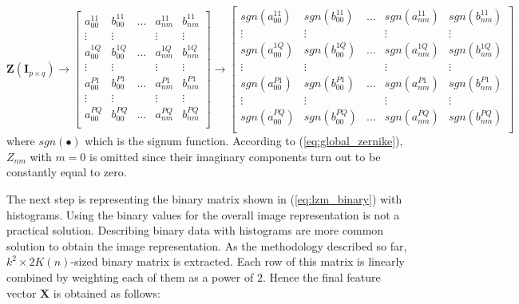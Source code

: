 \documentclass[]{spie}  %
\begin{document}
\begin{equation}
\mathbf{Z} ( \mathbf{I}_{p\times q} )
 \longrightarrow
 \begin{bmatrix}
a_{00}^{11} & b_{00}^{11} & \hdots & a_{nm}^{11}  & b_{nm}^{11} \\
  \vdots  & \vdots & & \vdots  & \vdots\\
a_{00}^{1Q} & b_{00}^{1Q} & \hdots & a_{nm}^{1Q}  & b_{nm}^{1Q} \\
  \vdots  & \vdots & & \vdots  & \vdots\\
a_{00}^{P1} & b_{00}^{P1} & \hdots & a_{nm}^{P1}  & b_{nm}^{P1} \\
  \vdots  & \vdots & & \vdots  & \vdots\\
a_{00}^{PQ} & b_{00}^{PQ} & \hdots & a_{nm}^{PQ}  & b_{nm}^{PQ} \\
 \end{bmatrix}
  \longrightarrow
  \begin{bmatrix}
sgn(a_{00}^{11}) & sgn(b_{00}^{11}) & \hdots & sgn(a_{nm}^{11}) & sgn(b_{nm}^{11}) \\
  \vdots  & \vdots & & \vdots  & \vdots\\
sgn(a_{00}^{1Q}) & sgn(b_{00}^{1Q}) & \hdots & sgn(a_{nm}^{1Q}) & sgn(b_{nm}^{1Q}) \\
  \vdots  & \vdots & & \vdots  & \vdots\\
sgn(a_{00}^{P1}) & sgn(b_{00}^{P1}) & \hdots & sgn(a_{nm}^{P1}) & sgn(b_{nm}^{P1}) \\
  \vdots  & \vdots & & \vdots  & \vdots\\
sgn(a_{00}^{PQ}) & sgn(b_{00}^{PQ}) & \hdots & sgn(a_{nm}^{PQ}) & sgn(b_{nm}^{PQ}) \\
 \end{bmatrix}
 \label{eq:lzm_binary}
\end{equation}
where $sgn(\bullet)$ which is the signum function. According to (\ref{eq:global_zernike}), $Z_{nm}$ with $m = 0$ is omitted since their imaginary components turn out to be constantly equal to zero. 

The next step is representing the binary matrix shown in (\ref{eq:lzm_binary}) with histograms. Using the binary values for the overall image representation is not a practical solution. Describing binary data with histograms are more common solution to obtain the image representation. As the methodology described so far, $k^2\times 2K(n)$-sized binary matrix is extracted. Each row of this matrix is linearly combined by weighting each of them as a power of $2$. Hence the final feature vector $\mathbf{X}$ is obtained as follows:
\end{document}
